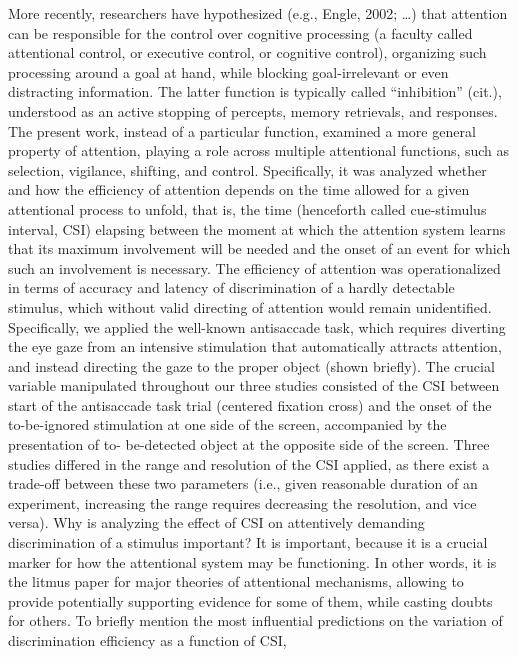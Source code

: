 \documentclass[
  man,draftall]{apa6}
\begin{document}
More recently, researchers have hypothesized (e.g., Engle, 2002; \ldots) that attention can
be responsible for the control over cognitive processing (a faculty called attentional control, or
executive control, or cognitive control), organizing such processing around a goal at hand, while
blocking goal-irrelevant or even distracting information. The latter function is typically called
``inhibition'' (cit.), understood as an active stopping of percepts, memory retrievals, and responses.
The present work, instead of a particular function, examined a more general property of attention,
playing a role across multiple attentional functions, such as selection, vigilance, shifting, and control.
Specifically, it was analyzed whether and how the efficiency of attention depends on the time
allowed for a given attentional process to unfold, that is, the time (henceforth called cue-stimulus
interval, CSI) elapsing between the moment at which the attention system learns that its maximum
involvement will be needed and the onset of an event for which such an involvement is necessary.
The efficiency of attention was operationalized in terms of accuracy and latency of discrimination of
a hardly detectable stimulus, which without valid directing of attention would remain unidentified.
Specifically, we applied the well-known antisaccade task, which requires diverting the eye gaze from
an intensive stimulation that automatically attracts attention, and instead directing the gaze to the
proper object (shown briefly). The crucial variable manipulated throughout our three studies
consisted of the CSI between start of the antisaccade task trial (centered fixation cross) and the onset
of the to-be-ignored stimulation at one side of the screen, accompanied by the presentation of to-
be-detected object at the opposite side of the screen. Three studies differed in the range and
resolution of the CSI applied, as there exist a trade-off between these two parameters (i.e., given
reasonable duration of an experiment, increasing the range requires decreasing the resolution, and
vice versa).
Why is analyzing the effect of CSI on attentively demanding discrimination of a stimulus important? It
is important, because it is a crucial marker for how the attentional system may be functioning. In
other words, it is the litmus paper for major theories of attentional mechanisms, allowing to provide
potentially supporting evidence for some of them, while casting doubts for others. To briefly mention
the most influential predictions on the variation of discrimination efficiency as a function of CSI,
\end{document}
